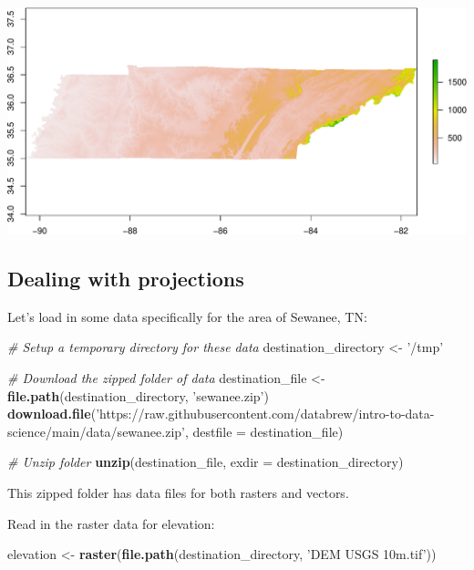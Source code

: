 \documentclass[]{book}
\newenvironment{Shaded}{\begin{snugshade}}{\end{snugshade}}
\newcommand{\CommentTok}[1]{\textcolor[rgb]{0.56,0.35,0.01}{\textit{#1}}}
\newcommand{\DataTypeTok}[1]{\textcolor[rgb]{0.13,0.29,0.53}{#1}}
\newcommand{\KeywordTok}[1]{\textcolor[rgb]{0.13,0.29,0.53}{\textbf{#1}}}
\newcommand{\NormalTok}[1]{#1}
\newcommand{\StringTok}[1]{\textcolor[rgb]{0.31,0.60,0.02}{#1}}
\begin{document}
\includegraphics{figures/unnamed-chunk-645-1.pdf}

\hypertarget{dealing-with-projections}{%
\subsection*{Dealing with projections}\label{dealing-with-projections}}

Let's load in some data specifically for the area of Sewanee, TN:

\begin{Shaded}
\begin{Highlighting}[]
\CommentTok{# Setup a temporary directory for these data}
\NormalTok{destination_directory <-}\StringTok{ '/tmp'}

\CommentTok{# Download the zipped folder of data}
\NormalTok{destination_file <-}\StringTok{ }\KeywordTok{file.path}\NormalTok{(destination_directory, }\StringTok{'sewanee.zip'}\NormalTok{)}
\KeywordTok{download.file}\NormalTok{(}\StringTok{'https://raw.githubusercontent.com/databrew/intro-to-data-science/main/data/sewanee.zip'}\NormalTok{,}
              \DataTypeTok{destfile =}\NormalTok{ destination_file)}

\CommentTok{# Unzip folder }
\KeywordTok{unzip}\NormalTok{(destination_file, }\DataTypeTok{exdir =}\NormalTok{ destination_directory)}
\end{Highlighting}
\end{Shaded}

This zipped folder has data files for both rasters and vectors.

Read in the raster data for elevation:

\begin{Shaded}
\begin{Highlighting}[]
\NormalTok{elevation <-}\StringTok{ }\KeywordTok{raster}\NormalTok{(}\KeywordTok{file.path}\NormalTok{(destination_directory,}
                              \StringTok{'DEM USGS 10m.tif'}\NormalTok{))}
\end{Highlighting}
\end{Shaded}
\end{document}
